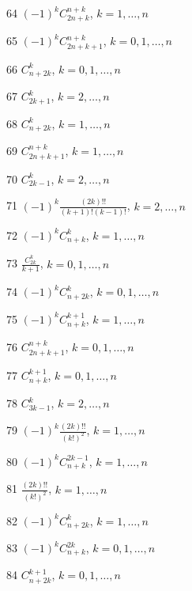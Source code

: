\documentclass[11pt, russian]{article}
\begin{document}
64 
$(-1)^{k}C_{2n+k}^{n+k}$, $k=1,\ldots,n$\par

65 
$(-1)^{k}C_{2n+k+1}^{n+k}$, $k=0,1,\ldots,n$\par

66 
$C_{n+2k}^{k}$, $k=0,1,\ldots,n$\par

67 
$C_{2k+1}^{k}$, $k=2,\ldots,n$\par

68 
$C_{n+2k}^{k}$, $k=1,\ldots,n$\par

69 
$C_{2n+k+1}^{n+k}$, $k=1,\ldots,n$\par

70 
$C_{2k-1}^{k}$, $k=2,\ldots,n$\par

71 
$(-1)^{k}\frac{(2k)!!}{(k+1)!(k-1)!}$, $k=2,\ldots,n$\par

72 
$(-1)^{k}C_{n+k}^{k}$, $k=1,\ldots,n$\par

73 
$\frac{C_{2k}^k}{k+1}$, $k=0,1,\ldots,n$\par

74 
$(-1)^{k}C_{n+2k}^{k}$, $k=0,1,\ldots,n$\par

75 
$(-1)^{k}C_{n+k}^{k+1}$, $k=1,\ldots,n$\par

76 
$C_{2n+k+1}^{n+k}$, $k=0,1,\ldots,n$\par

77 
$C_{n+k}^{k+1}$, $k=0,1,\ldots,n$\par

78 
$C_{3k-1}^{k}$, $k=2,\ldots,n$\par

79 
$(-1)^{k}\frac{(2k)!!}{(k!)^2}$, $k=1,\ldots,n$\par

80 
$(-1)^{k}C_{n+k}^{2k-1}$, $k=1,\ldots,n$\par

81 
$\frac{(2k)!!}{(k!)^2}$, $k=1,\ldots,n$\par

82 
$(-1)^{k}C_{n+2k}^{k}$, $k=1,\ldots,n$\par

83 
$(-1)^{k}C_{n+k}^{2k}$, $k=0,1,\ldots,n$\par

84 
$C_{n+2k}^{k+1}$, $k=0,1,\ldots,n$\par
\end{document}
